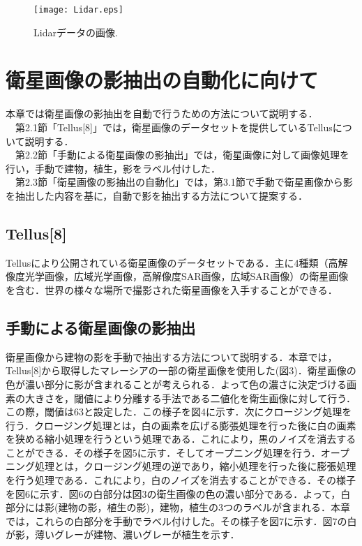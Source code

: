 \documentclass[a4j,twoside,twocolumn]{jarticle}
\begin{document}
\begin{figure}[t]
  \begin{center}
    \texttt{[image: Lidar.eps]}
    \caption{Lidarデータの画像.}
    \label{fig2}
  \end{center}
\end{figure}



\section{衛星画像の影抽出の自動化に向けて}
本章では衛星画像の影抽出を自動で行うための方法について説明する．\\
　第2.1節「Tellus[8]」では，衛星画像のデータセットを提供しているTellusについて説明する．\\
　第2.2節「手動による衛星画像の影抽出」では，衛星画像に対して画像処理を行い，手動で建物，植生，影をラベル付けした．\\
　第2.3節「衛星画像の影抽出の自動化」では，第3.1節で手動で衛星画像から影を抽出した内容を基に，自動で影を抽出する方法について提案する．\\
\subsection{Tellus[8]}
Tellusにより公開されている衛星画像のデータセットである．主に4種類（高解像度光学画像，広域光学画像，高解像度SAR画像，広域SAR画像）の衛星画像を含む．世界の様々な場所で撮影された衛星画像を入手することができる．\\
\subsection{手動による衛星画像の影抽出}
衛星画像から建物の影を手動で抽出する方法について説明する．本章では，Tellus[8]から取得したマレーシアの一部の衛星画像を使用した(図3)．衛星画像の色が濃い部分に影が含まれることが考えられる．よって色の濃さに決定づける画素の大きさを，閾値により分離する手法である二値化を衛生画像に対して行う．この際，閾値は63と設定した．この様子を図4に示す．次にクロージング処理を行う．クロージング処理とは，白の画素を広げる膨張処理を行った後に白の画素を狭める縮小処理を行うという処理である．これにより，黒のノイズを消去することができる．その様子を図5に示す．そしてオープニング処理を行う．オープニング処理とは，クロージング処理の逆であり，縮小処理を行った後に膨張処理を行う処理である．これにより，白のノイズを消去することができる．その様子を図6に示す．図6の白部分は図3の衛生画像の色の濃い部分である．よって，白部分には影(建物の影，植生の影)，建物，植生の3つのラベルが含まれる．本章では，これらの白部分を手動でラベル付けした。その様子を図7に示す．図7の白が影，薄いグレーが建物、濃いグレーが植生を示す．\\
\end{document}
